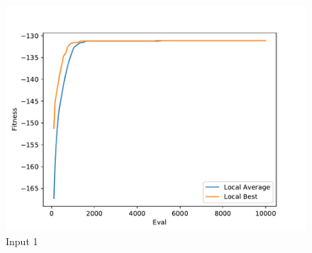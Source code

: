 \documentclass{standalone}
\begin{document}
\begin{figure}[!htb]
	\caption{Input 1}
	\label{fig:graph_1073}
	\includegraphics[width=\textwidth]{../graphs/graphs/1073.pdf}
\end{figure}
\end{document}

